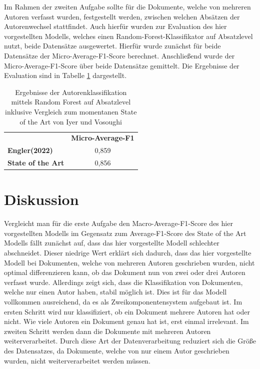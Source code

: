 \documentclass[conference]{IEEEtran}
\begin{document}
	Im Rahmen der zweiten Aufgabe sollte für die Dokumente, welche von mehreren Autoren verfasst wurden, festgestellt werden, zwischen welchen Absätzen der Autorenwechsel stattfindet. Auch hierfür wurden zur Evaluation des hier vorgestellten Modells, welches einen Random-Forest-Klassifikator auf Absatzlevel nutzt, beide Datensätze ausgewertet. Hierfür wurde zunächst für beide Datensätze der Micro-Average-F1-Score berechnet. Anschließend wurde der Micro-Average-F1-Score über beide Datensätze gemittelt. Die Ergebnisse der Evaluation sind in Tabelle \ref{tab:erg3} dargestellt.
	
	\begin{table}[htbp]
		\caption{Ergebnisse der Autorenklassifikation mittels Random Forest auf Absatzlevel inklusive Vergleich zum momentanen State of the Art von Iyer und Vosoughi}
		\begin{center}
			\begin{tabular}{|lc|}
				\hline
				 & \textbf{Micro-Average-F1} \\
				 \cellcolor{gray!15}\textbf{Engler(2022)} & \cellcolor{gray!15}0,859 \\
				 \textbf{State of the Art} & 0,856 \\
				\hline
			\end{tabular}
			\label{tab:erg3}
		\end{center}
	\end{table}
\section{Diskussion}
	Vergleicht man für die erste Aufgabe den Macro-Average-F1-Score des hier vorgestellten Modells im Gegensatz zum Average-F1-Score des State of the Art Modells fällt zunächst auf, dass das hier vorgestellte Modell schlechter abschneidet. Dieser niedrige Wert erklärt sich dadurch, dass das hier vorgestellte Modell bei Dokumenten, welche von mehreren Autoren geschrieben wurden, nicht optimal differenzieren kann, ob das Dokument nun von zwei oder drei Autoren verfasst wurde. Allerdings zeigt sich, dass die Klassifikation von Dokumenten, welche nur einen Autor haben, stabil möglich ist. Dies ist für das Modell vollkommen ausreichend, da es als Zweikomponentensystem aufgebaut ist. Im ersten Schritt wird nur klassifiziert, ob ein Dokument mehrere Autoren hat oder nicht. Wie viele Autoren ein Dokument genau hat ist, erst einmal irrelevant. Im zweiten Schritt werden dann die Dokumente mit mehreren Autoren weiterverarbeitet. Durch diese Art der Datenverarbeitung reduziert sich die Größe des Datensatzes, da Dokumente, welche von nur einem Autor geschrieben wurden, nicht weiterverarbeitet werden müssen.
	
\end{document}
